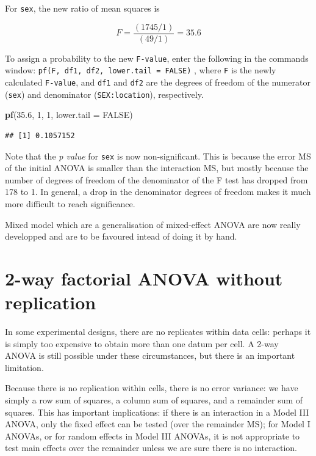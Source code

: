 \documentclass[
  12pt,
]{book}
\makeatletter
\newenvironment{Shaded}{\begin{snugshade}}{\end{snugshade}}
\newcommand{\DataTypeTok}[1]{\textcolor[rgb]{0.13,0.29,0.53}{#1}}
\newcommand{\DecValTok}[1]{\textcolor[rgb]{0.00,0.00,0.81}{#1}}
\newcommand{\FloatTok}[1]{\textcolor[rgb]{0.00,0.00,0.81}{#1}}
\newcommand{\KeywordTok}[1]{\textcolor[rgb]{0.13,0.29,0.53}{\textbf{#1}}}
\newcommand{\NormalTok}[1]{#1}
\newcommand{\OtherTok}[1]{\textcolor[rgb]{0.56,0.35,0.01}{#1}}
\newenvironment{kframe}{%
\medskip{}
\setlength{\fboxsep}{.8em}
\def\at@end@of@kframe{}%
\ifinner\ifhmode%
 \def\at@end@of@kframe{\end{minipage}}%
 \begin{minipage}{\columnwidth}%
\fi\fi%
\def\FrameCommand##1{\hskip\@totalleftmargin \hskip-\fboxsep
\colorbox{incolor}{##1}\hskip-\fboxsep
    \hskip-\linewidth \hskip-\@totalleftmargin \hskip\columnwidth}%
\MakeFramed {\advance\hsize-\width
  \@totalleftmargin\z@ \linewidth\hsize
  \@setminipage}}%
{\par\unskip\endMakeFramed%
\at@end@of@kframe}
\newenvironment{rmdblock}[1]
 {
 \begin{itemize}
 \renewcommand{\labelitemi}{
   \raisebox{-.7\height}[0pt][0pt]{
     {\setkeys{Gin}{width=3em,keepaspectratio}\texttt{[image: images/\#1]}}
   }
 }
 \begin{kframe}
 \setlength{\fboxsep}{1em}
 \item
 }
 {
 \end{kframe}
 \end{itemize}
 }
\newenvironment{rmdnote}
  {\begin{rmdblock}{note}}
  {\end{rmdblock}}
\newenvironment{rmdwarning}
  {\begin{rmdblock}{warning}}
  {\end{rmdblock}}
\makeatother
\begin{document}
For \texttt{sex}, the new ratio of mean squares is

\[F = \frac{(1745/1)}{(49/1)} = 35.6\]

To assign a probability to the new \texttt{F-value}, enter the following in the commands window: \texttt{pf(F,\ df1,\ df2,\ lower.tail\ =\ FALSE)} , where \texttt{F} is the newly calculated \texttt{F-value}, and \texttt{df1} and \texttt{df2} are the degrees of freedom of the numerator (\texttt{sex}) and denominator (\texttt{SEX:location}), respectively.

\begin{Shaded}
\begin{Highlighting}[]
\KeywordTok{pf}\NormalTok{(}\FloatTok{35.6}\NormalTok{, }\DecValTok{1}\NormalTok{, }\DecValTok{1}\NormalTok{, }\DataTypeTok{lower.tail =} \OtherTok{FALSE}\NormalTok{)}
\end{Highlighting}
\end{Shaded}

\begin{verbatim}
## [1] 0.1057152
\end{verbatim}

Note that the \emph{p value} for \texttt{sex} is now non-significant. This is because the error MS of the initial ANOVA is smaller than the interaction MS, but mostly because the number of degrees of freedom of the denominator of the F test has dropped from 178 to 1. In general, a drop in the denominator degrees of freedom makes it much more difficult to reach significance.

\begin{rmdnote}
Mixed model which are a generalisation of mixed-effect ANOVA are now really developped and are to be favoured intead of doing it by hand.
\end{rmdnote}

\hypertarget{way-factorial-anova-without-replication}{%
\section{2-way factorial ANOVA without replication}\label{way-factorial-anova-without-replication}}

In some experimental designs, there are no replicates within data cells: perhaps it is simply too expensive to obtain more than one datum per cell. A 2-way ANOVA is still possible under these circumstances, but there is an important limitation.

\begin{rmdwarning}
Because there is no replication within cells, there is no error variance: we have simply a row sum of squares, a column sum of squares, and a remainder sum of squares. This has important implications: if there is an interaction in a Model III ANOVA, only the fixed effect can be tested (over the remainder MS); for Model I ANOVAs, or for random effects in Model III ANOVAs, it is not appropriate to test main effects over the remainder unless we are sure there is no interaction.
\end{rmdwarning}
\end{document}
